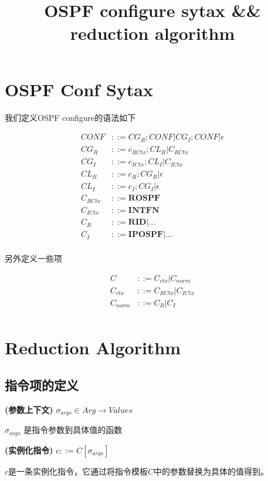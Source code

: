 \documentclass{article}
\title{OSPF configure sytax \&\& reduction algorithm}
\begin{document}
\maketitle

\section{OSPF Conf Sytax}
我们定义OSPF configure的语法如下


\begin{align*}
    CONF &::= CG_{R};CONF | CG_{I};CONF |\epsilon \\
    CG_{R} &::= c_{RCtx};CL_{R} | C_{RCtx}  \\
    CG_{I} &::= c_{ICtx};CL_{I} | C_{ICtx}  \\
    CL_{R} &::= c_{R};CG_{R} | \epsilon \\
    CL_{I} &::= c_{I};CG_{I} | \epsilon \\
    C_{RCtx} &::= \textbf{ROSPF} \\
    C_{ICtx} &::= \textbf{INTFN} \\
    C_{R} &::= \textbf{RID} | ... \\
    C_{I} &::= \textbf{IPOSPF} | ... \\
\end{align*}

另外定义一些项

\begin{align*}
    C &::= C_{ctx} | C_{norm} \\
    C_{ctx} &::= C_{RCtx} | C_{ICtx} \\
    C_{norm} &::= C_{R} | C_{I} \\\textbf{}
\end{align*}


\section{Reduction Algorithm}

\subsection{指令项的定义}

\textbf{(参数上下文)} $\sigma_{args} \in Arg \longrightarrow Values$

$\sigma_{args}$ 是指令参数到具体值的函数


\textbf{(实例化指令)} $c::=C[\sigma_{args}]$

$c$是一条实例化指令，它通过将指令模板$C$中的参数替换为具体的值得到。
\end{document}
